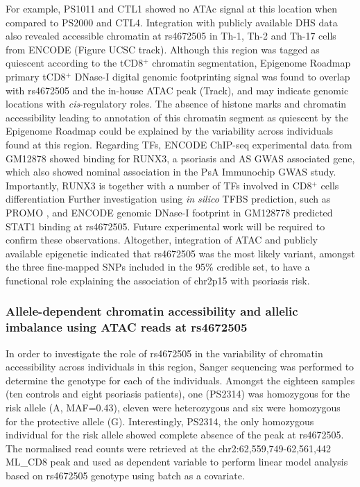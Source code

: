 For example, PS1011 and CTL1 showed no ATAc signal at this location when compared to PS2000 and CTL4. Integration with publicly available DHS data also revealed accessible chromatin at rs4672505 in Th-1, Th-2 and Th-17 cells from ENCODE (Figure UCSC track). Although this region was tagged as quiescent according to the tCD8$^+$ chromatin segmentation, Epigenome Roadmap primary tCD8$^+$ DNase-I digital genomic footprinting signal was found to overlap with rs4672505 and the in-house ATAC peak (Track), and may indicate genomic locations with \textit{cis}-regulatory roles. The absence of histone marks and chromatin accessibility leading to annotation of this chromatin segment as quiescent by the Epigenome Roadmap could be explained by the variability across individuals found at this region. Regarding TFs, ENCODE ChIP-seq experimental data from GM12878 showed binding for RUNX3, a psoriasis and AS GWAS associated gene, which also showed nominal association in the PsA Immunochip GWAS study. Importantly, RUNX3 is together with a number of TFs involved in CD8$^+$ cells differentiation \parencite{Wong2011}  Further investigation using \textit{in silico} TFBS prediction, such as PROMO \parencite{Messeguer2002}, and ENCODE genomic DNase-I footprint in GM128778 predicted STAT1 binding at rs4672505. Future experimental work will be required to confirm these observations. Altogether, integration of ATAC and publicly available epigenetic indicated that rs4672505 was the most likely variant, amongst the three fine-mapped SNPs included in the 95\% credible set, to have a functional role explaining the association of chr2p15 with psoriasis risk.


\subsubsection{Allele-dependent chromatin accessibility and allelic imbalance using ATAC reads at rs4672505}
In order to investigate the role of rs4672505 in the variability of chromatin accessibility across individuals in this region, Sanger sequencing was performed to determine the genotype for each of the individuals. Amongst the eighteen samples (ten controls and eight psoriasis patients), one (PS2314) was homozygous for the risk allele (A, MAF=0.43), eleven were heterozygous and six were homozygous for the protective allele (G). Interestingly, PS2314, the only homozygous individual for the risk allele showed complete absence of the peak at rs4672505. The normalised read counts were retrieved at the chr2:62,559,749-62,561,442 ML\_CD8 peak and used as dependent variable to perform linear model analysis based on rs4672505 genotype using batch as a covariate. 



